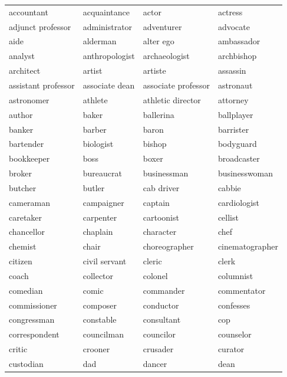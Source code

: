 \documentclass[11pt]{article}
\begin{document}
\begin{table}[t]
    \centering
    \begin{adjustbox}{height=4.2in}
    \begin{tabular}{l l l l}
    \toprule
        accountant & acquaintance & actor & actress \\
        adjunct professor & administrator & adventurer & advocate \\
        aide & alderman & alter ego & ambassador \\
        analyst & anthropologist & archaeologist & archbishop \\
        architect & artist & artiste & assassin \\
        assistant professor & associate dean & associate professor & astronaut \\
        astronomer & athlete & athletic director & attorney \\
        author & baker & ballerina & ballplayer \\
        banker & barber & baron & barrister \\
        bartender & biologist & bishop & bodyguard \\
        bookkeeper & boss & boxer & broadcaster \\
        broker & bureaucrat & businessman & businesswoman \\
        butcher & butler & cab driver & cabbie \\
        cameraman & campaigner & captain & cardiologist \\
        caretaker & carpenter & cartoonist & cellist \\
        chancellor & chaplain & character & chef \\
        chemist & chair & choreographer & cinematographer \\
        citizen & civil servant & cleric & clerk \\
        coach & collector & colonel & columnist \\
        comedian & comic & commander & commentator \\
        commissioner & composer & conductor & confesses \\
        congressman & constable & consultant & cop \\
        correspondent & councilman & councilor & counselor \\
        critic & crooner & crusader & curator \\
        custodian & dad & dancer & dean \\

\end{tabular}
\end{adjustbox}
\end{table}
\end{document}
